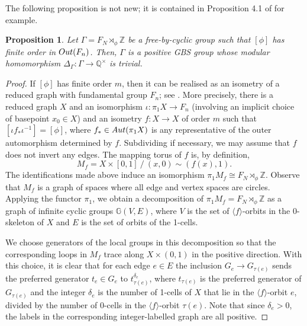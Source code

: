\documentclass[11pt, a4 paper]{amsart}
\numberwithin{equation}{section}
\newtheorem{proposition}[theorem]{Proposition}
\theoremstyle{remark}
\theoremstyle{definition}
\def\Z{\mathbb Z}
\def\G{\Gamma}
\def\out{{\rm{Out}}}
\def\GG{\mathbb{G}}
\def\d{\delta}
\def\G{\Gamma}
\def\<{\langle}
\def\>{\rangle}
\begin{document}
The following proposition is not new; it is contained in 
Proposition 4.1 of \cite{levitt2015generalized} for example. 

\begin{proposition}
	\label{prop:graph_of_Zs}
	Let $\Gamma = F_N \rtimes_{\phi} \Z$ be 
	a free-by-cyclic group 
	such that $[\phi]$ has finite order in $\out(F_n)$. 
	Then, $\Gamma$ is a positive GBS group 
	whose modular homomorphism 
	$\Delta_\G:\G\to \mathbb{Q}^\times$ is trivial. 
\end{proposition}

\begin{proof} 
	If $[\phi]$ has finite order $m$, 
	then it can be realised as 
	an isometry of a reduced graph with fundamental group $F_n$; 
	see \cite{culler1984finite}. 
	More precisely, there is a reduced graph $X$ 
	and an isomorphism $\iota:\pi_1X\to F_n$ 
	(involving an implicit choice of basepoint $x_0\in X$) 
	and an isometry $f : X\to X$ of order $m$ 
	such that $[\iota f_* \iota^{-1}] = [\phi]$, 
	where $f_*\in {\rm{Aut}}(\pi_1X)$ is 
	any representative of the outer automorphism determined by $f$. 
	Subdividing if necessary, 
	we may assume that $f$ does not invert any edges. 
	The mapping torus of $f$ is, by definition, 
	\begin{equation*}
		M_f = X \times [0,1] \ / \ (x,0) \sim (f(x), 1). 
	\end{equation*}
	The identifications made above induce an isomorphism 
	$\pi_1 M_f \cong F_N\rtimes_\phi\Z$. 
	Observe that $M_f$ is a graph of spaces 
	where all edge and vertex spaces are circles. 
	Applying the functor $\pi_1$, 
	we obtain a decomposition of $\pi_1M_f=F_N \rtimes_{\phi} \Z$ 
	as a graph of infinite cyclic groups $\GG(V,E)$, 
	where $V$ is the set of $\<f\>$-orbits in the 0-skeleton of $X$ 
	and $E$ is the set of orbits of the 1-cells. 
	
	We choose generators of the local groups in this decomposition 
	so that the corresponding loops in $M_f$ 
	trace along $X\times (0,1)$ in the positive direction. 
	With this choice, it is clear that for each edge $e\in E$
	the inclusion $G_e\to G_{\tau(e)}$ sends 
	the preferred generator $t_e\in G_e$ to $t_{\tau(e)}^{\d_e}$, 
	where $t_{\tau(e)}$ is the preferred generator of $G_{\tau(e)}$
	and the integer $\d_e$ is the number of 1-cells of $X$ 
	that lie in the $\<f\>$-orbit $e$, 
	divided by the number of 0-cells in the $\<f\>$-orbit $\tau(e)$. 
	Note that since $\d_e>0$, 
	the labels in the corresponding integer-labelled graph 
	are all positive.
	

\end{proof}
\end{document}
